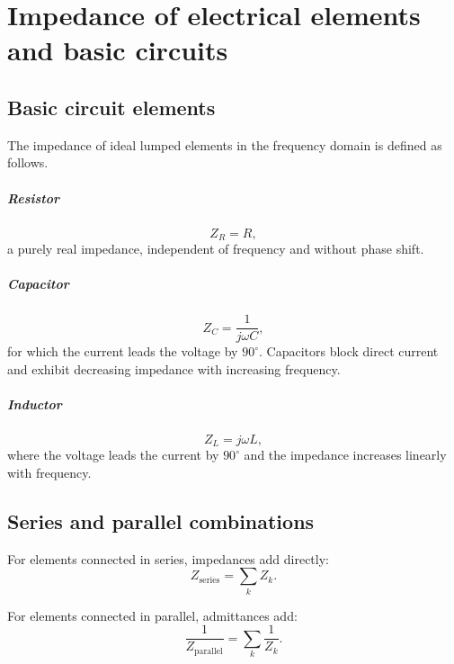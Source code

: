 \appendix

\chapter{Impedance of electrical elements and basic circuits}
\label{app:imp elements}

\section{Basic circuit elements}

The impedance of ideal lumped elements in the frequency domain is defined as follows.

\paragraph{Resistor}
\begin{equation}
    Z_R = R,
\end{equation}
a purely real impedance, independent of frequency and without phase shift.

\paragraph{Capacitor}
\begin{equation}
    Z_C = \frac{1}{j\omega C},
\end{equation}
for which the current leads the voltage by $90^\circ$. Capacitors block direct current and exhibit decreasing impedance with increasing frequency.

\paragraph{Inductor}
\begin{equation}
    Z_L = j\omega L,
\end{equation}
where the voltage leads the current by $90^\circ$ and the impedance increases linearly with frequency.
\section{Series and parallel combinations}

For elements connected in series, impedances add directly:
\begin{equation}
    Z_{\mathrm{series}} = \sum_k Z_k.
\end{equation}

For elements connected in parallel, admittances add:
\begin{equation}
    \frac{1}{Z_{\mathrm{parallel}}} = \sum_k \frac{1}{Z_k}.
\end{equation}

